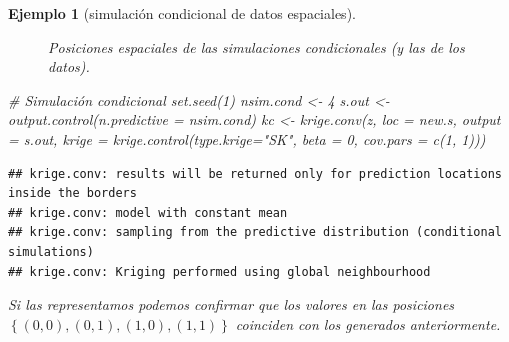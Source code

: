 \documentclass[
]{book}
\newenvironment{Shaded}{\begin{snugshade}}{\end{snugshade}}
\newcommand{\AttributeTok}[1]{\textcolor[rgb]{0.77,0.63,0.00}{#1}}
\newcommand{\CommentTok}[1]{\textcolor[rgb]{0.56,0.35,0.01}{\textit{#1}}}
\newcommand{\DecValTok}[1]{\textcolor[rgb]{0.00,0.00,0.81}{#1}}
\newcommand{\FunctionTok}[1]{\textcolor[rgb]{0.00,0.00,0.00}{#1}}
\newcommand{\NormalTok}[1]{#1}
\newcommand{\OtherTok}[1]{\textcolor[rgb]{0.56,0.35,0.01}{#1}}
\newcommand{\StringTok}[1]{\textcolor[rgb]{0.31,0.60,0.02}{#1}}
\theoremstyle{break}
\newtheorem{example}{Ejemplo}[chapter]
\theoremstyle{nonumberplain}
\begin{document}
\begin{example}[simulación condicional de datos espaciales]
\begin{figure}[!htb]
{}

\caption{Posiciones espaciales de las simulaciones condicionales (y las de los datos).}\label{fig:pos-sp-simcond}
\end{figure}

\begin{Shaded}
\begin{Highlighting}[]
\CommentTok{\# Simulación condicional}
\FunctionTok{set.seed}\NormalTok{(}\DecValTok{1}\NormalTok{)}
\NormalTok{nsim.cond }\OtherTok{\textless{}{-}} \DecValTok{4}
\NormalTok{s.out }\OtherTok{\textless{}{-}} \FunctionTok{output.control}\NormalTok{(}\AttributeTok{n.predictive =}\NormalTok{ nsim.cond)}
\NormalTok{kc }\OtherTok{\textless{}{-}} \FunctionTok{krige.conv}\NormalTok{(z, }\AttributeTok{loc =}\NormalTok{ new.s, }\AttributeTok{output =}\NormalTok{ s.out,}
                 \AttributeTok{krige =} \FunctionTok{krige.control}\NormalTok{(}\AttributeTok{type.krige=}\StringTok{"SK"}\NormalTok{, }\AttributeTok{beta =} \DecValTok{0}\NormalTok{, }\AttributeTok{cov.pars =} \FunctionTok{c}\NormalTok{(}\DecValTok{1}\NormalTok{, }\DecValTok{1}\NormalTok{)))}
\end{Highlighting}
\end{Shaded}

\begin{verbatim}
## krige.conv: results will be returned only for prediction locations inside the borders
## krige.conv: model with constant mean
## krige.conv: sampling from the predictive distribution (conditional simulations)
## krige.conv: Kriging performed using global neighbourhood
\end{verbatim}

Si las representamos podemos confirmar que los valores en las posiciones \(\left\{(0,0),(0,1),(1,0),(1,1)\right\}\) coinciden con los generados anteriormente.


\end{example}
\end{document}
